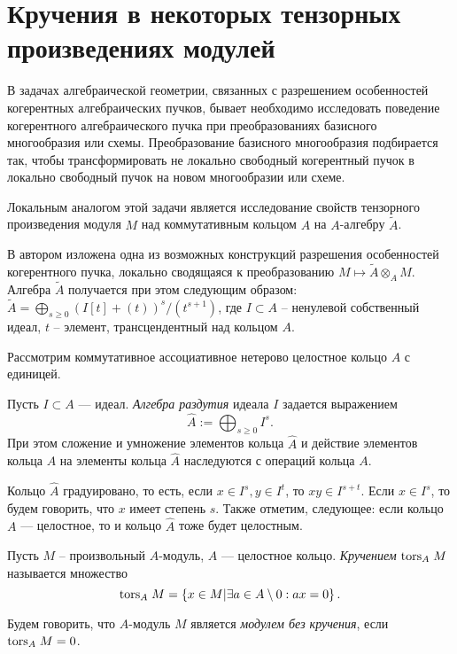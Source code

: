 \section{Кручения в некоторых тензорных произведениях модулей}
    В задачах алгебраической геометрии, связанных с разрешением особенностей когерентных 
    алгебраических пучков, бывает необходимо 
    исследовать поведение когерентного алгебраического пучка при преобразованиях базисного 
    многообразия или схемы.
    Преобразование базисного многообразия подбирается так, чтобы трансформировать не локально 
    свободный когерентный пучок в локально
    свободный пучок на новом многообразии или схеме. 

    Локальным аналогом этой задачи является исследование свойств тензорного произведения модуля $M$ 
    над коммутативным кольцом $A$ на $A$-алгебру $\widetilde{A}$.

    В \cite{Timofeeva} автором изложена одна из возможных конструкций разрешения особенностей когерентного пучка, 
    локально сводящаяся к преобразованию $M \mapsto \widetilde{A} \otimes_A M$.
    Алгебра $\widetilde{A}$ получается при этом следующим образом: 
    $\widetilde{A} = \bigoplus_{s \geq 0} (I[t] + (t))^s / (t^{s + 1})$, где $I \subset A$ -- 
    ненулевой собственный
    идеал, $t$ -- элемент, трансцендентный над кольцом $A$.

    Рассмотрим коммутативное ассоциативное нетерово целостное кольцо $A$ с единицей. 
    
    \begin{Def}
        Пусть $I \subset A$ --- идеал. \textit{Алгебра раздутия} идеала $I$ задается выражением 
        $$\widehat{A} := \bigoplus_{s \geq 0} I^s.$$
        При этом сложение и умножение элементов кольца $\widehat{A}$ и действие элементов кольца $A$
        на элементы кольца $\widehat{A}$ наследуются с операций кольца $A$.
    \end{Def}
    Кольцо $\widehat{A}$ градуировано, то есть, если $x \in I^s, y \in I^t$, то $xy \in I^{s + t}$.
    Если $x \in I^s$, то будем говорить, что $x$ имеет степень $s$.
    Также отметим, следующее: если кольцо $A$ --- целостное, то и кольцо $\hat A$ тоже будет целостным.

    \begin{Def}
        Пусть $M$ -- произвольный $A$-модуль, $A$ --- целостное кольцо. 
        \textit{Кручением} $\textup{tors}_{A}\;M$ называется множество
        \begin{equation*}
            \textup{tors}_{A}\;M = \left\{x \in M | \exists a \in A\setminus 0 : ax = 0 \right\}.
        \end{equation*}
    \end{Def}
    \begin{Def}
        Будем говорить, что $A$-модуль $M$ является \textit{модулем без кручения}, если $\textup{tors}_{A}\;M = 0$.
    \end{Def}

